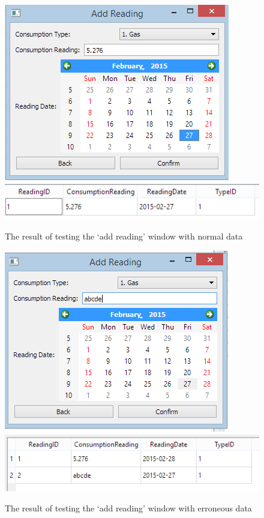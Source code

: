 \begin{figure}[H] 
	\includegraphics{./testing/images/test_2_1_add_reading_data.png}
	\includegraphics{./testing/images/test_2_1_add_reading_data_added.png}
	\caption{The result of testing the `add reading' window with normal data} \label{fig:test_2.1_result}
\end{figure}

\begin{figure}[H]
	\includegraphics{./testing/images/test_2_2_add_reading_data_erroneous.png}
	\includegraphics{./testing/images/test_2_2_add_reading_data_erroneous_added.png}
	\caption{The result of testing the `add reading' window with erroneous data} \label{fig:test_2.2_result}
\end{figure}

